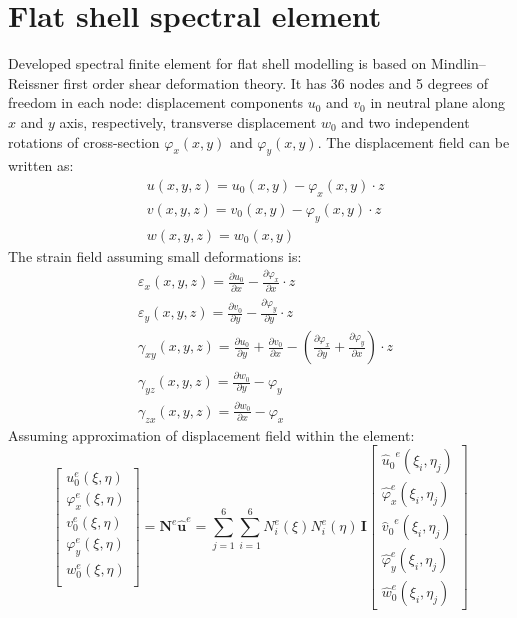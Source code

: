 \documentclass[preprint,12pt]{elsarticle}
\renewcommand{\vec}[1]{\mathbf{#1}}
\renewcommand{\bm}[1]{\mathbf{#1}}
\begin{document}
	\section{Flat shell spectral element}
	Developed spectral finite element for flat shell modelling is based on Mindlin--Reissner first order shear deformation theory. It has 36 nodes and 5 degrees of freedom in each node: displacement components $u_0$ and $v_0$ in neutral plane along $x$ and $y$ axis, respectively, transverse displacement $w_0$ and two independent rotations of cross-section $\varphi_x(x,y)$ and $\varphi_y(x,y)$. The displacement field can be written as:
	\begin{equation}
	\begin{split}
	& u(x,y,z)=u_0(x,y) - \varphi_x(x,y) \cdot z\\
	& v(x,y,z)=v_0(x,y) - \varphi_y(x,y) \cdot z\\
	& w(x,y,z)=w_0(x,y) \label{eq:delam_platedispl}
	\end{split}
	\end{equation}
	The strain field assuming small deformations is:
	\begin{equation}
	\begin{split}
	& \varepsilon_x(x,y,z)= \frac{\partial u_0}{\partial x} - \frac{\partial \varphi_x}{\partial x} \cdot z\\
	& \varepsilon_y(x,y,z)=\frac{\partial v_0}{\partial y} - \frac{\partial \varphi_y}{\partial y} \cdot z\\
	& \gamma_{xy}(x,y,z)= \frac{\partial u_0}{\partial y} +  \frac{\partial v_0}{\partial x} - \left( \frac{\partial \varphi_x}{\partial y} + \frac{\partial \varphi_y}{\partial x}\right)\cdot z\\
	& \gamma_{yz}(x,y,z)= \frac{\partial w_0}{\partial y} - \varphi_y\\
	& \gamma_{zx}(x,y,z)= \frac{\partial w_0}{\partial x} - \varphi_x 
	\label{eq:delam_platestrains}
	\end{split}
	\end{equation}
	Assuming approximation of displacement field within the element:
	\begin{equation}
	\left[\begin{array}{l} u_0^e(\xi, \eta) \\ \varphi_x^e(\xi, \eta)\\ v_0^e(\xi, \eta) \\ \varphi_y^e(\xi, \eta)\\ w_0^e(\xi, \eta)\\ \end{array}\right] = \bm{N}^e \vec{\hat{u}}^e = \sum \limits_{j=1}^{6} \sum \limits_{i=1}^{6} N^e_i(\xi) N^e_i(\eta)\, \bm{I} \left[ \begin{array}{l} {\hat{u}_0}^e(\xi_i,\eta_j)\\\hat{\varphi}_x^e(\xi_i,\eta_j)\\{\hat{v}_0}^e(\xi_i,\eta_j) \\\hat{\varphi}_y^e(\xi_i,\eta_j) \\ \hat{w}_0^e(\xi_i,\eta_j)\end{array} \right]\label{eq:delam_plateaproxim}
	\end{equation}  
\end{document}
